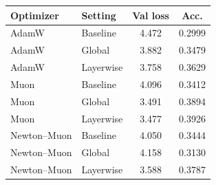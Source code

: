 \begin{tabular}{llcc}
\toprule
\textbf{Optimizer} & \textbf{Setting} & \textbf{Val loss} & \textbf{Acc.} \\
\midrule
AdamW & Baseline & 4.472 & 0.2999 \\
AdamW & Global & 3.882 & 0.3479 \\
AdamW & Layerwise & 3.758 & 0.3629 \\
Muon & Baseline & 4.096 & 0.3412 \\
Muon & Global & 3.491 & 0.3894 \\
Muon & Layerwise & 3.477 & 0.3926 \\
Newton--Muon & Baseline & 4.050 & 0.3444 \\
Newton--Muon & Global & 4.158 & 0.3130 \\
Newton--Muon & Layerwise & 3.588 & 0.3787 \\
\bottomrule
\end{tabular}
